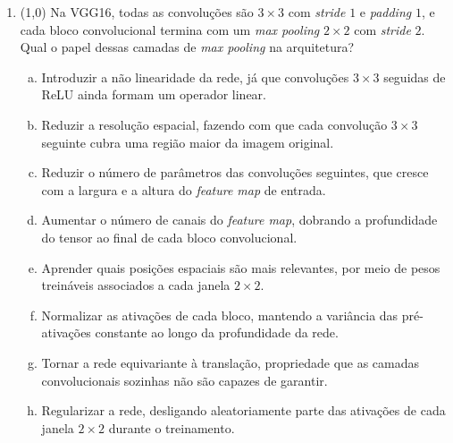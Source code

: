 \documentclass[11pt,a4paper]{article}
\begin{document}
\begin{enumerate}[1)]
\begin{enumerate}[a)]
    \item (1) equivariante; (2) invariante; (3) \textit{stride}
    \item (1) invariante; (2) invariante; (3) \textit{padding}
    \item (1) invariante; (2) equivariante; (3) \textit{padding}
    \item (1) equivariante; (2) equivariante; (3) \textit{stride}
    \item (1) invariante; (2) equivariante; (3) \textit{stride}
    \item (1) equivariante; (2) invariante; (3) \textit{padding}
    \item (1) invariante; (2) invariante; (3) \textit{stride}
    \item (1) equivariante; (2) equivariante; (3) \textit{padding}
\end{enumerate}

\item (1{,}0) Na VGG16, todas as convoluções são $3 \times 3$ com \textit{stride} $1$ e \textit{padding} $1$, e cada bloco convolucional termina com um \textit{max pooling} $2 \times 2$ com \textit{stride} $2$. Qual o papel dessas camadas de \textit{max pooling} na arquitetura?
\begin{enumerate}[a)]
    \item Introduzir a não linearidade da rede, já que convoluções $3 \times 3$ seguidas de ReLU ainda formam um operador linear.
    \item Reduzir a resolução espacial, fazendo com que cada convolução $3 \times 3$ seguinte cubra uma região maior da imagem original.
    \item Reduzir o número de parâmetros das convoluções seguintes, que cresce com a largura e a altura do \textit{feature map} de entrada.
    \item Aumentar o número de canais do \textit{feature map}, dobrando a profundidade do tensor ao final de cada bloco convolucional.
    \item Aprender quais posições espaciais são mais relevantes, por meio de pesos treináveis associados a cada janela $2 \times 2$.
    \item Normalizar as ativações de cada bloco, mantendo a variância das pré-ativações constante ao longo da profundidade da rede.
    \item Tornar a rede equivariante à translação, propriedade que as camadas convolucionais sozinhas não são capazes de garantir.
    \item Regularizar a rede, desligando aleatoriamente parte das ativações de cada janela $2 \times 2$ durante o treinamento.
\end{enumerate}


\end{enumerate}
\end{document}
